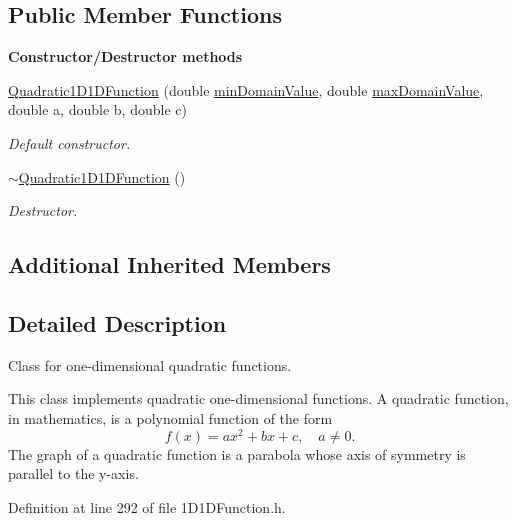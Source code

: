 \subsection*{Public Member Functions}
\begin{Indent}{\bf Constructor/\-Destructor methods}\par
\begin{DoxyCompactItemize}
\item 
\hyperlink{class_q_u_e_s_o_1_1_quadratic1_d1_d_function_a3ad7d62950748c04897381b297db6aea}{Quadratic1\-D1\-D\-Function} (double \hyperlink{class_q_u_e_s_o_1_1_base1_d1_d_function_a4c110e621ef1ac557bbcc60d41f5a3c2}{min\-Domain\-Value}, double \hyperlink{class_q_u_e_s_o_1_1_base1_d1_d_function_ad2b80d0c52c0cb56c89f70f30b3bb19e}{max\-Domain\-Value}, double a, double b, double c)
\begin{DoxyCompactList}\small\item\em Default constructor. \end{DoxyCompactList}\item 
\hyperlink{class_q_u_e_s_o_1_1_quadratic1_d1_d_function_a52969f14fb922dae2df3823e411877ea}{$\sim$\-Quadratic1\-D1\-D\-Function} ()
\begin{DoxyCompactList}\small\item\em Destructor. \end{DoxyCompactList}\end{DoxyCompactItemize}
\end{Indent}
\subsection*{Additional Inherited Members}


\subsection{Detailed Description}
Class for one-\/dimensional quadratic functions. 

This class implements quadratic one-\/dimensional functions. A quadratic function, in mathematics, is a polynomial function of the form \[ f(x)=ax^2+bx+c,\quad a \ne 0.\] The graph of a quadratic function is a parabola whose axis of symmetry is parallel to the y-\/axis. 

Definition at line 292 of file 1\-D1\-D\-Function.\-h.




